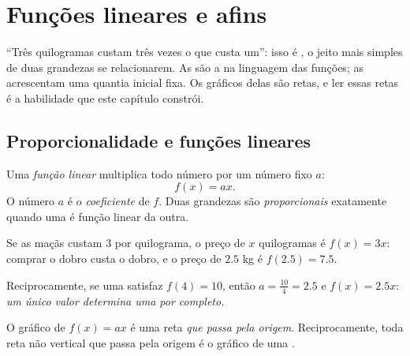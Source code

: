 \chapter{Funções lineares e afins}\label{ch:g9:linfunc}

``Três quilogramas custam três vezes o que custa um'': isso é
, o jeito mais simples de duas grandezas se
relacionarem. As  são a  na linguagem
das funções; as  acrescentam uma quantia inicial fixa. Os
gráficos delas são retas, e ler essas retas é a habilidade que este
capítulo constrói.

\section{Proporcionalidade e funções lineares}

\begin{definition}\label{def:g9:linfunc:linear}
Uma \emph{função linear} multiplica todo número
por um número fixo $a$:
\[
f(x) = a x .
\]
O número $a$ é o \emph{coeficiente} de $f$. Duas grandezas são
\emph{proporcionais} exatamente quando uma é
função linear da outra.
\end{definition}

\begin{example}\label{ex:g9:linfunc:linear}
Se as maçãs custam $3$ por quilograma, o preço de $x$ quilogramas é
$f(x) = 3x$: comprar o dobro custa o dobro, e o preço de $2.5$ kg é
$f(2.5) = 7.5$.

Reciprocamente, se uma  satisfaz $f(4) = 10$, então
$a = \frac{10}{4} = 2.5$ e $f(x) = 2.5x$: \emph{um único valor
determina uma  por completo.}
\end{example}

\begin{proposition}\label{prop:g9:linfunc:lineargraph}
O gráfico de $f(x) = ax$ é uma reta \emph{que passa pela origem}.
Reciprocamente, toda reta não vertical que passa pela origem é o
gráfico de uma .
\end{proposition}
\admitted

